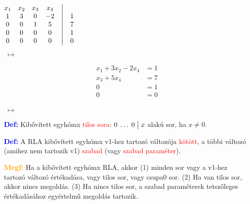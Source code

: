 \documentclass[../szamtud.tex]{subfiles}
\begin{document}
            \begin{minipage}{.25\linewidth}
                $ \begin{matrix}
                    x_1 & x_2 & x_3 & x_4 & \bigm| &  \\
                    1 & 3 & 0 & -2 & \bigm| & 1 \\
                    0 & 0 & 1 & 5 & \bigm| & 7 \\
                    0 & 0 & 0 & 0 & \bigm| & 1 \\
                    0 & 0 & 0 & 0 & \bigm| & 0 
                \end{matrix}  $
            \end{minipage}
            \begin{minipage}{.05\linewidth}
                $\;\mapsto\;$
            \end{minipage}
            \begin{minipage}{.15\linewidth}
                \begin{align*}
                    x_1+3x_2-2x_4 &= 1 \\
                    x_3+5x_4 &= 7 \\
                    0 &= 1 \\
                    0 &= 0 \\
                \end{align*}
            \end{minipage}
            \begin{minipage}{.05\linewidth}
                $\;\mapsto\;$
            \end{minipage}
            \begin{minipage}{.05\linewidth}
                \Large\Lightning
            \end{minipage}


        \textcolor{blue}{\textbf{Def:}} Kibővített egyhómx \textcolor{red}{tilos sora}: $0 \; \dots \; 0 \bigm|  x$ alakú sor, ha $x \neq 0$.

        \textcolor{blue}{\textbf{Def:}} A RLA kibővített egyhómx v1-hez tartozó változója \textcolor{red}{kötött}, a többi változó (amihez nem tartozik v1) \textcolor{red}{szabad} (vagy \textcolor{red}{szabad paraméter}). 

        \textcolor{orange}{\textbf{Megf:}} Ha a kibővített egyhómx RLA, akkor (1) minden sor vagy a v1-hez tartozó változó értékadása, vagy tilos sor, vagy csupa0 sor. (2) Ha van tilos sor, akkor nincs megoldás. (3) Ha nincs tilos sor, a szabad paraméterek tetszőleges értékadásához egyértelmű megoldás tartozik.
\end{document}
